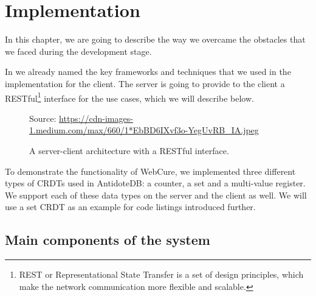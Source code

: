 \chapter{Implementation}
\label{Implementation}

In this chapter, we are going to describe the way we overcame the obstacles that we faced during the development stage.

In  we already named the key frameworks and techniques that we used in the implementation for the client. The server is going to provide to the client a RESTful\footnote{REST or Representational State Transfer is a set of design principles, which make the network communication more flexible and scalable\cite{40}.} interface for the use cases, which we will describe below.

\begin{figure}[!htb]
    \begin{center}
    \setlength{\fboxsep}{4pt}%
    \setlength{\fboxrule}{1pt}%
    {\scriptsize%
     Source: \url{https://cdn-images-1.medium.com/max/660/1*EbBD6IXvf3o-YegUvRB_IA.jpeg}}
    \caption {A server-client architecture with a RESTful interface.}
    \label{fig:design1}
\end{center}
\end{figure}

To demonstrate the functionality of WebCure, we implemented three different types of CRDTs used in AntidoteDB: a counter, a set and a multi-value register. We support each of these data types on the server and the client as well. We will use a set CRDT as an example for code listings introduced further.

\section{Main components of the system}
\label{sysmaincomponents}

